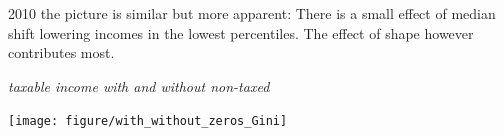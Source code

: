 \documentclass[twoside]{article}\usepackage[]{graphicx}\usepackage[]{color}
\newenvironment{knitrout}{}{} %
\begin{document}
\begin{multicols}{2}
2010 the picture is similar but more apparent: There is a small effect of median shift lowering incomes in the lowest percentiles. The effect of shape however contributes most.






\emph{taxable income with and without non-taxed}




\begin{knitrout}
\color{fgcolor}
\texttt{[image: figure/with\_without\_zeros\_Gini]} 

\end{knitrout}



\end{multicols}
\end{document}
